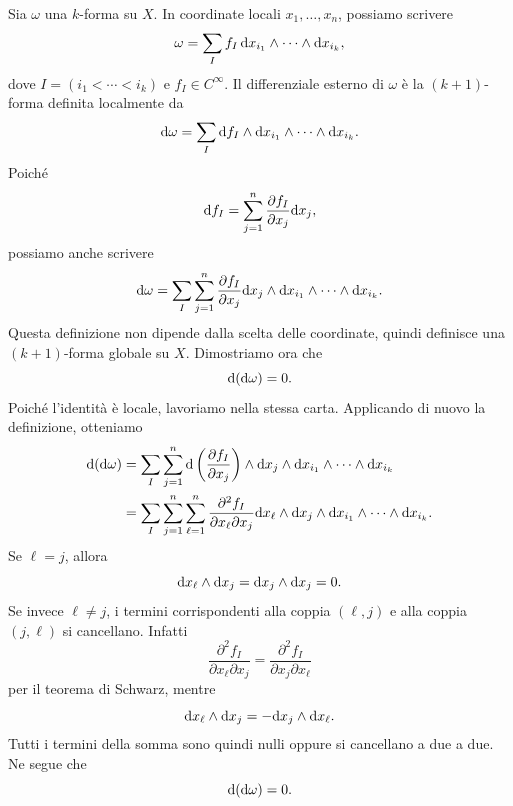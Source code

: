 \documentclass[a4paper]{article}
\begin{document}
\begin{snippetproof}{}
    Sia \(\omega\) una \(k\)-forma su \(X\). In coordinate locali \(x_1,\ldots,x_n\), possiamo scrivere
    \[
        \omega
        =
        \sum_{I} f_I\,\text d x_{i_1}\wedge\cdots\wedge \text d x_{i_k},
    \]
    dove \(I=(i_1<\cdots<i_k)\) e \(f_I\in C^\infty\). Il differenziale esterno di \(\omega\) è la \((k+1)\)-forma definita localmente da
    \[
        \text d\omega
        =
        \sum_I \text d f_I\wedge \text d x_{i_1}\wedge\cdots\wedge \text d x_{i_k}.
    \]
    Poiché
    \[
        \text d f_I
        =
        \sum_{j=1}^n
        \frac{\partial f_I}{\partial x_j}\text d x_j,
    \]
    possiamo anche scrivere
    \[
        \text d\omega
        =
        \sum_I\sum_{j=1}^n
        \frac{\partial f_I}{\partial x_j}
        \text d x_j\wedge \text d x_{i_1}\wedge\cdots\wedge \text d x_{i_k}.
    \]
    Questa definizione non dipende dalla scelta delle coordinate, quindi definisce una \((k+1)\)-forma globale su \(X\).
    Dimostriamo ora che
    \[
        \text d(\text d\omega)=0.
    \]
    Poiché l'identità è locale, lavoriamo nella stessa carta. Applicando di nuovo la definizione, otteniamo
    \begin{align*}
        \text d(\text d\omega)
        &=
        \sum_I\sum_{j=1}^n
        \text d\left(
            \frac{\partial f_I}{\partial x_j}
        \right)
        \wedge
        \text d x_j\wedge \text d x_{i_1}\wedge\cdots\wedge \text d x_{i_k}\\
        &=
        \sum_I\sum_{j=1}^n\sum_{\ell=1}^n
        \frac{\partial^2 f_I}{\partial x_\ell\partial x_j}
        \text d x_\ell\wedge \text d x_j
        \wedge
        \text d x_{i_1}\wedge\cdots\wedge \text d x_{i_k}.
    \end{align*}
    Se \(\ell=j\), allora
    \[
        \text d x_\ell\wedge \text d x_j
        =
        \text d x_j\wedge \text d x_j
        =
        0.
    \]
    Se invece \(\ell\neq j\), i termini corrispondenti alla coppia \((\ell,j)\) e alla coppia \((j,\ell)\) si cancellano. Infatti
    \[
        \frac{\partial^2 f_I}{\partial x_\ell\partial x_j}
        =
        \frac{\partial^2 f_I}{\partial x_j\partial x_\ell}
    \]
    per il teorema di Schwarz, mentre
    \[
        \text d x_\ell\wedge \text d x_j
        =
        -
        \text d x_j\wedge \text d x_\ell.
    \]
    Tutti i termini della somma sono quindi nulli oppure si cancellano a due a due. Ne segue che
    \[
        \text d(\text d\omega)=0.
    \]
\end{snippetproof}
\end{document}
